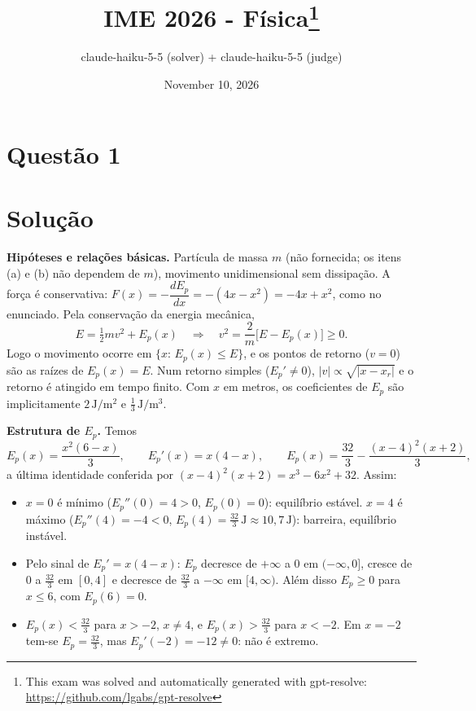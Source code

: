 \documentclass{article}%
\title{IME 2026 - Física\thanks{This exam was solved and automatically generated with gpt-resolve: \url{https://github.com/lgabs/gpt-resolve}}}%
\author{claude{-}haiku{-}5{-}5 (solver) + claude{-}haiku{-}5{-}5 (judge)}%
\date{November 10, 2026}%
\begin{document}
%
\normalsize%
\maketitle%
\section*{Questão 1}

\section*{Solução}

\textbf{Hipóteses e relações básicas.} Partícula de massa $m$ (não fornecida; os itens (a) e (b) não dependem de $m$), movimento unidimensional sem dissipação. A força é conservativa: $F(x)=-\dfrac{dE_p}{dx}=-(4x-x^{2})=-4x+x^{2}$, como no enunciado. Pela conservação da energia mecânica,
\[
E=\tfrac12 m v^{2}+E_p(x)\quad\Longrightarrow\quad v^{2}=\frac{2}{m}\bigl[E-E_p(x)\bigr]\ge 0 .
\]
Logo o movimento ocorre em $\{x:\,E_p(x)\le E\}$, e os pontos de retorno ($v=0$) são as raízes de $E_p(x)=E$. Num retorno simples ($E_p'\neq 0$), $|v|\propto\sqrt{|x-x_r|}$ e o retorno é atingido em tempo finito. Com $x$ em metros, os coeficientes de $E_p$ são implicitamente $2\,\mathrm{J/m^{2}}$ e $\tfrac13\,\mathrm{J/m^{3}}$.

\textbf{Estrutura de $E_p$.} Temos
\[
E_p(x)=\frac{x^{2}(6-x)}{3},\qquad E_p'(x)=x(4-x),\qquad E_p(x)=\frac{32}{3}-\frac{(x-4)^{2}(x+2)}{3},
\]
a última identidade conferida por $(x-4)^{2}(x+2)=x^{3}-6x^{2}+32$. Assim:
\begin{itemize}
\item $x=0$ é mínimo ($E_p''(0)=4>0$, $E_p(0)=0$): equilíbrio estável. $x=4$ é máximo ($E_p''(4)=-4<0$, $E_p(4)=\tfrac{32}{3}\,\mathrm{J}\approx 10{,}7\,\mathrm{J}$): barreira, equilíbrio instável.
\item Pelo sinal de $E_p'=x(4-x)$: $E_p$ decresce de $+\infty$ a $0$ em $(-\infty,0]$, cresce de $0$ a $\tfrac{32}{3}$ em $[0,4]$ e decresce de $\tfrac{32}{3}$ a $-\infty$ em $[4,\infty)$. Além disso $E_p\ge 0$ para $x\le 6$, com $E_p(6)=0$.
\item $E_p(x)<\tfrac{32}{3}$ para $x>-2$, $x\neq 4$, e $E_p(x)>\tfrac{32}{3}$ para $x<-2$. Em $x=-2$ tem-se $E_p=\tfrac{32}{3}$, mas $E_p'(-2)=-12\neq 0$: não é extremo.
\end{itemize}
\end{document}
